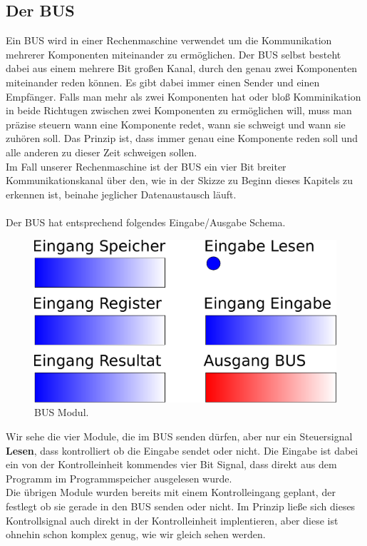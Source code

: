 \documentclass[11pt,a4paper,leqno]{report}
\numberwithin{equation}{chapter}
\begin{document}
\subsection{Der BUS}
Ein BUS wird in einer Rechenmaschine verwendet um die Kommunikation mehrerer Komponenten miteinander zu erm\"oglichen. Der BUS selbst besteht dabei aus einem mehrere Bit gro\ss{}en Kanal, durch den genau zwei Komponenten miteinander reden k\"onnen. Es gibt dabei immer einen Sender und einen Empf\"anger. Falls man mehr als zwei Komponenten hat oder blo\ss{} Komminikation in beide Richtugen zwischen zwei Komponenten zu erm\"oglichen will, muss man pr\"azise steuern wann eine Komponente redet, wann sie schweigt und wann sie zuh\"oren soll. Das Prinzip ist, dass immer genau eine Komponente reden soll und alle anderen zu dieser Zeit schweigen sollen.\\
Im Fall unserer Rechenmaschine ist der BUS ein vier Bit breiter Kommunikationskanal \"uber den, wie in der Skizze zu Beginn dieses Kapitels zu erkennen ist, beinahe jeglicher Datenaustausch l\"auft.\\
\\
Der BUS hat entsprechend folgendes Eingabe/Ausgabe Schema.
\begin{figure}[H]
	\begin{center}
		\includegraphics[scale=0.3]{bus.pdf}
		\caption{BUS Modul.}
	\end{center}
\end{figure}
\noindent
Wir sehe die vier Module, die im BUS senden d\"urfen, aber nur ein Steuersignal \textbf{Lesen}, dass kontrolliert ob die Eingabe sendet oder nicht. Die Eingabe ist dabei ein von der Kontrolleinheit kommendes vier Bit Signal, dass direkt aus dem Programm im Programmspeicher ausgelesen wurde.\\
Die \"ubrigen Module wurden bereits mit einem Kontrolleingang geplant, der festlegt ob sie gerade in den BUS senden oder nicht. Im Prinzip lie\ss{}e sich dieses Kontrollsignal auch direkt in der Kontrolleinheit implentieren, aber diese ist ohnehin schon komplex genug, wie wir gleich sehen werden.\\
\end{document}

